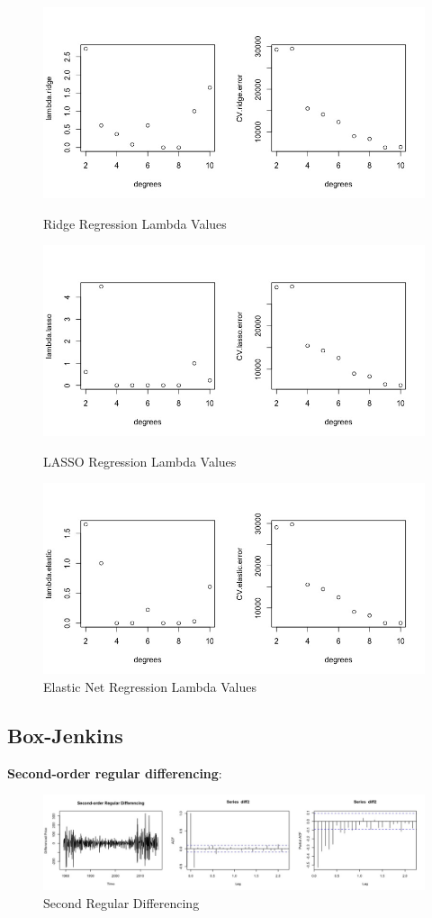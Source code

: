 \documentclass[paper=letter, fontsize=11pt]{scrartcl}
\begin{document}
\begin{figure}[H]
    \centering
    \includegraphics[width=0.75\linewidth]{Image/ridge-lambda.jpeg}
    \caption{Ridge Regression Lambda Values}

    \includegraphics[width=0.75\linewidth]{Image/lasso-lambda.jpeg}
    \caption{LASSO Regression Lambda Values}

    \includegraphics[width=0.75\linewidth]{Image/elastic-lambda.jpeg}
    \caption{Elastic Net Regression Lambda Values}
\end{figure}



\subsection{Box-Jenkins}

\textbf{Second-order regular differencing}:

\begin{figure}[ht]
    \centering
    \includegraphics[width=\linewidth]{Image/diff2.jpeg}
    \caption{Second Regular Differencing}
    \label{fig:diff2}
\end{figure}
\end{document}
